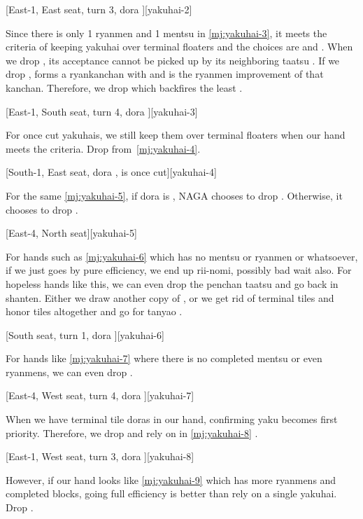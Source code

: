 \documentclass[12pt]{article}
\begin{document}
[East-1, East seat, turn 3, dora ][yakuhai-2]

Since there is only 1 ryanmen and 1 mentsu in \ref{mj:yakuhai-3}, it meets the criteria of keeping yakuhai over terminal floaters and the choices are  and . When we drop , its acceptance  cannot be picked up by its neighboring taatsu . If we drop ,  forms a ryankanchan with  and  is the ryanmen improvement of that kanchan. Therefore, we drop  which backfires the least \citep{yuusee-yakuand1}.

[East-1, South seat, turn 4, dora ][yakuhai-3]

For once cut yakuhais, we still keep them over terminal floaters when our hand meets the criteria. Drop  from~\ref{mj:yakuhai-4}.

[South-1, East seat, dora ,  is once cut][yakuhai-4]

For the same \ref{mj:yakuhai-5}, if dora is , NAGA chooses to drop . Otherwise, it chooses to drop .

[East-4, North seat][yakuhai-5]

For hands such as \ref{mj:yakuhai-6} which has no mentsu or ryanmen or whatsoever, if we just goes by pure efficiency, we end up rii-nomi, possibly bad wait also. For hopeless hands like this, we can even drop the penchan taatsu and go back in shanten. Either we draw another copy of , or we get rid of terminal tiles and honor tiles altogether and go for tanyao \citep[][p.~15]{zero-teyaku}.

[South seat, turn 1, dora ][yakuhai-6]

For hands like \ref{mj:yakuhai-7} where there is no completed mentsu or even ryanmens, we can even drop  \citep{yuusee-yakuand2}.

[East-4, West seat, turn 4, dora ][yakuhai-7]

When we have terminal tile doras in our hand, confirming yaku becomes first priority. Therefore, we drop  and rely on  in \ref{mj:yakuhai-8} \citep{yuusee-yakuand2}.

[East-1, West seat, turn 3, dora ][yakuhai-8]

However, if our hand looks like \ref{mj:yakuhai-9} which has more ryanmens and completed blocks, going full efficiency is better than rely on a single yakuhai. Drop  \citep[][p.~15]{zero-teyaku}.
\end{document}
